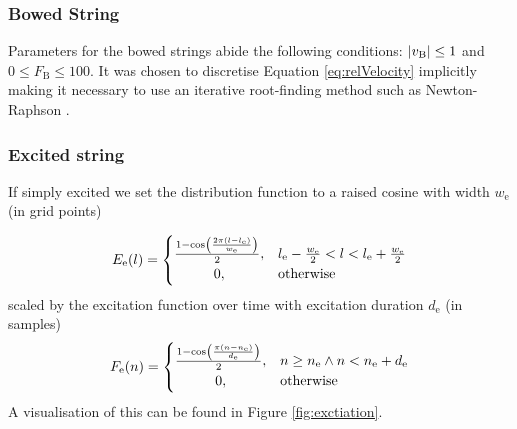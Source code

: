 \documentclass{article}
\begin{document}
\subsubsection{Bowed String}
Parameters for the bowed strings abide the following conditions: $\abs{v_\text{B}} \leq 1$ and $0 \leq F_\text{B} \leq 100$. It was chosen to discretise Equation \eqref{eq:relVelocity} implicitly %
making it necessary to use an iterative root-finding method such as Newton-Raphson \cite{Wallis1685}.

\subsubsection{Excited string}
If simply excited we set the distribution function to a raised cosine with width $w_\text{e}$ (in grid points)

\begin{equation}\label{eq:discDist}
    E_\text{e}(l) = 
    \begin{cases}
        \hfil \frac{1 - \cos(\frac{2 \pi (l - l_\text{e})}{w_\text{e}})}{2}, & l_\text{e} -  \frac{w_\text{e}}{2} < l < l_\text{e} + \frac{w_\text{e}}{2} \\
        \hfil 0, &\text{otherwise}
    \end{cases}
\end{equation}
scaled by the excitation function over time with excitation duration $d_\text{e}$ (in samples)
\begin{equation}\label{eq:discExcitation}
    F_\text{e}(n) = 
    \begin{cases}
        \frac{1 - \cos(\frac{\pi (n - n_\text{e})}{d_\text{e}})}{2}, & n \geq n_\text{e} \wedge n < n_\text{e}+d_\text{e}\\
        \hfil 0, &\text{otherwise}
    \end{cases}
\end{equation}
A visualisation of this can be found in Figure \ref{fig:exctiation}.
\end{document}
